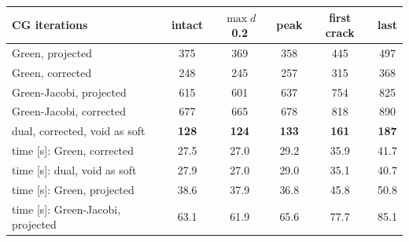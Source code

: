 \documentclass[11pt,a4paper]{article}
\begin{document}
\begin{center}
\small
\begin{tabular}{lccccc}
  \toprule
  CG iterations & intact & $\max d$ 0.2 & peak & first crack & last \\
  \midrule
  Green, projected                  & 375 & 369 & 358 & 445 & 497 \\
  Green, corrected                  & 248 & 245 & 257 & 315 & 368 \\
  Green-Jacobi, projected           & 615 & 601 & 637 & 754 & 825 \\
  Green-Jacobi, corrected           & 677 & 665 & 678 & 818 & 890 \\
  dual, corrected, void as soft     & \textbf{128} & \textbf{124} & \textbf{133} & \textbf{161} & \textbf{187} \\
  \midrule
  time [s]: Green, corrected        & 27.5 & 27.0 & 29.2 & 35.9 & 41.7 \\
  time [s]: dual, void as soft      & 27.9 & 27.0 & 29.0 & 35.1 & 40.7 \\
  time [s]: Green, projected        & 38.6 & 37.9 & 36.8 & 45.8 & 50.8 \\
  time [s]: Green-Jacobi, projected & 63.1 & 61.9 & 65.6 & 77.7 & 85.1 \\
  \bottomrule
\end{tabular}
\end{center}
\end{document}
